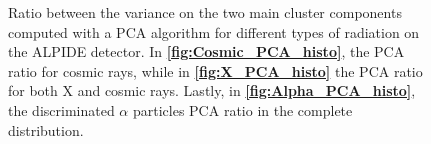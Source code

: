 \documentclass[../../main/main.tex]{subfiles}
\begin{document}
\begin{figure}[h]
    \begin{minipage}[c]{0.33\linewidth}
        \vspace{0pt}
        \centering
    \end{minipage}%
    \hfill%
    \begin{minipage}[c]{0.33\linewidth}
        \vspace{0pt}
        \centering
    \end{minipage}%
    \hfill%
    \begin{minipage}[c]{0.33\linewidth}
        \vspace{0pt}
        \centering
    \end{minipage}
    \caption{Ratio between the variance on the two main cluster components computed with a PCA algorithm for different types of radiation on the ALPIDE detector. In \textbf{\ref{fig:Cosmic_PCA_histo}}, the PCA ratio for cosmic rays, while in \textbf{\ref{fig:X_PCA_histo}} the PCA ratio for both X and cosmic rays. Lastly, in \textbf{\ref{fig:Alpha_PCA_histo}}, the discriminated \( \alpha \) particles PCA ratio in the complete distribution.}
    \label{fig:PCA_PCA_histos}
\end{figure}
\end{document}
